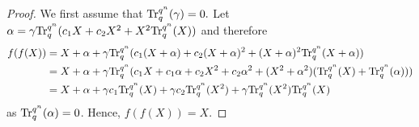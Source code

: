 \documentclass[11pt]{amsart}
\theoremstyle{plain}
\numberwithin{equation}{section}
\theoremstyle{definition}
\def\Tr{{\rm Tr}}
\begin{document}
\begin{proof}
    We first assume that $\Tr_{q}^{q^n}(\gamma)=0.$ Let $\alpha=\gamma \Tr_{q}^{q^n}(c_1X+c_2X^2+X^2\Tr_{q}^{q^n}(X))$ and therefore
  \begin{equation*}
 \begin{split}
      f(f(X))&=X+\alpha+\gamma\Tr_{q}^{q^n}(c_1(X+\alpha)+c_2(X+\alpha)^2+(X+\alpha)^2\Tr_{q}^{q^n}(X+\alpha))\\
      &=X+\alpha+\gamma \Tr_{q}^{q^n}(c_1X+c_1\alpha +c_2X^2+c_2\alpha^2+(X^2+\alpha^2)( \Tr_{q}^{q^n}(X)+ \Tr_{q}^{q^n}(\alpha)))
      \\&=X+\alpha+\gamma c_1 \Tr_{q}^{q^n}(X)+\gamma c_2 \Tr_{q}^{q^n}(X^2)+\gamma \Tr_{q}^{q^n}(X^2)\Tr_{q}^{q^n}(X)
      \end{split}
  \end{equation*}
as $\Tr_{q}^{q^n}(\alpha)=0$. Hence, $f(f(X))=X.$


\end{proof}
\end{document}
